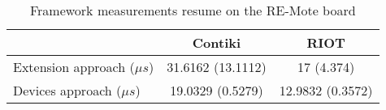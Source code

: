 \begin{table}[!ht]
  \centering
  \begin{tabular}{l|c|c}
                      & Contiki           & RIOT             \\ \hline
  Extension approach ($\mu s$) & 31.6162 (13.1112) & 17 (4.374)       \\
  Devices approach ($\mu s$)   & 19.0329 (0.5279)  & 12.9832 (0.3572)
  \end{tabular}
  \caption{Framework measurements resume on the RE-Mote board}
  \label{tab:framework-measurements-resume-remote}
  \end{table}